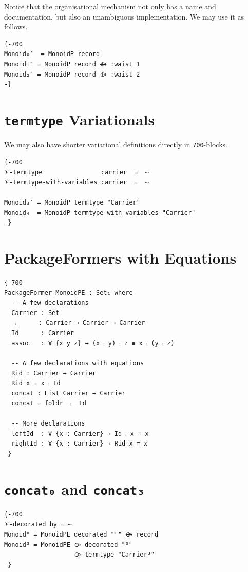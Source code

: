 \documentclass[sigplan,screen]{acmart}
\begin{document}
\begin{appendices}
Notice that the organisational mechanism not only has a name and documentation,
but also an unambiguous implementation. We may use it as follows.

\begin{verbatim}
{-700
Monoid₀′  = MonoidP record
Monoid₁″ = MonoidP record ⟴ :waist 1
Monoid₂″ = MonoidP record ⟴ :waist 2
-}
\end{verbatim}

\newpage

\section{\texttt{termtype} Variationals}
\label{sec:org24514d0}

We may also have shorter variational definitions directly in \texttt{700}-blocks.
\begin{verbatim}
{-700
𝒱-termtype                carrier  =  ⋯
𝒱-termtype-with-variables carrier  =  ⋯

Monoid₃′ = MonoidP termtype "Carrier"
Monoid₄  = MonoidP termtype-with-variables "Carrier"
-}
\end{verbatim}

\section{PackageFormers with Equations}
\label{sec:orge61aa2f}

\begin{verbatim}
{-700
PackageFormer MonoidPE : Set₁ where
  -- A few declarations
  Carrier : Set
  _⨾_     : Carrier → Carrier → Carrier
  Id      : Carrier
  assoc   : ∀ {x y z} → (x ⨾ y) ⨾ z ≡ x ⨾ (y ⨾ z)

  -- A few declarations with equations
  Rid : Carrier → Carrier
  Rid x = x ⨾ Id
  concat : List Carrier → Carrier
  concat = foldr _⨾_ Id

  -- More declarations
  leftId  : ∀ {x : Carrier} → Id ⨾ x ≡ x
  rightId : ∀ {x : Carrier} → Rid x ≡ x
-}
\end{verbatim}

\section{\texttt{concat₀} and \texttt{concat₃}}
\label{sec:orgb28b10e}

\begin{verbatim}
{-700
𝒱-decorated by = ⋯
Monoid⁰ = MonoidPE decorated "⁰" ⟴ record
Monoid³ = MonoidPE ⟴ decorated "³"
                   ⟴ termtype "Carrier³"
-}
\end{verbatim}


\end{appendices}
\end{document}
